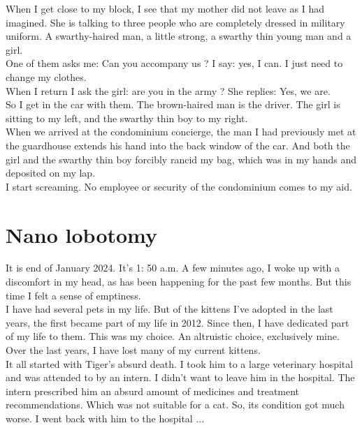\documentclass[11pt]{book}
\begin{document}
\noindent When I get close to my block, I see that my mother did not leave as I had imagined. She is talking to three people who are completely dressed in military uniform. A swarthy-haired man, a little strong, a swarthy thin young man and a girl. \\

\noindent One of them asks me: Can you accompany us ? I say: yes, I can. I just need to change my clothes. \\

\noindent When I return I ask the girl: are you in the army ? She replies: Yes, we are. \\

\noindent So I get in the car with them. The brown-haired man is the driver. The girl is sitting to my left, and the swarthy thin boy to my right. \\

\noindent When we arrived at the condominium concierge, the man I had previously met at the guardhouse extends his hand into the back window of the car. And both the girl and the swarthy thin boy forcibly rancid my bag, which was in my hands and deposited on my lap. \\

\noindent I start screaming. No employee or security of the condominium comes to my aid. 

\chapter{Nano lobotomy}

\noindent It is end of January 2024. It's 1: 50 a.m. A few minutes ago, I woke up with a discomfort in my head, as has been happening for the past few months. But this time I felt a sense of emptiness. \\

\noindent I have had several pets in my life. But of the kittens I've adopted in the last years, the first became part of my life in 2012. Since then, I have dedicated part of my life to them. This was my choice. An altruistic choice, exclusively mine. \\

\noindent Over the last years, I have lost many of my current kittens. \\

\noindent It all started with Tiger's absurd death. I took him to a large veterinary hospital and was attended to by an intern. I didn't want to leave him in the hospital. The intern prescribed him an absurd amount of medicines and treatment recommendations. Which was not suitable for a cat. So, its condition got much worse. I went back with him to the hospital ... 
\end{document}
